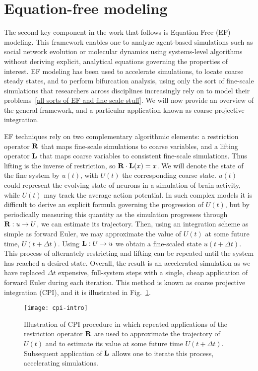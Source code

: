 \section{Equation-free modeling\label{sec:ef}}

The second key component in the work that follows is Equation Free
(EF) modeling. This framework enables one to analyze agent-based
simulations such as social network evolution or molecular dynamics
using systems-level algorithms without deriving explicit, analytical
equations governing the properties of interest. EF modeling has been
used to accelerate simulations, to locate coarse steady states, and to
perform bifurcation analysis, using only the sort of fine-scale
simulations that researchers across disciplines increasingly rely on
to model their problems~\ref{all sorts of EF and fine scale stuff}. We
will now provide an overview of the general framework, and a particular
application known as coarse projective integration.

EF techniques rely on two complementary algorithmic elements: a
restriction operator $\mathbf{R}$ that maps fine-scale simulations to coarse
variables, and a lifting operator $\mathbf{L}$ that maps coarse variables to
consistent fine-scale simulations. Thus lifting is the inverse of
restriction, so $\mathbf{R} \cdot \mathbf{L} (x) = x$. We will denote the state of
the fine system by $u(t)$, with $U(t)$ the corresponding coarse
state. $u(t)$ could represent the evolving state of neurons in a
simulation of brain activity, while $U(t)$ may track the average
action potential. In such complex models it is difficult to derive an
explicit formula governing the progression of $U(t)$, but by
periodically measuring this quantity as the simulation progresses
through $\mathbf{R}: u \rightarrow U$, we can estimate its trajectory. Then,
using an integration scheme as simple as forward Euler, we may
approximate the value of $U(t)$ at some future time,
$U(t + \Delta t)$. Using $\mathbf{L}: U \rightarrow u$ we obtain a
fine-scaled state $u(t + \Delta t)$. This process of alternately
restricting and lifting can be repeated until the system has reached a
desired state. Overall, the result is an accelerated simulation as we
have replaced $\Delta t$ expensive, full-system steps with a single,
cheap application of forward Euler during each iteration. This method
is known as coarse projective integration (CPI), and it is illustrated
in Fig.~\ref{fig:cpi-ill}.

\begin{figure}
  \centering
  \texttt{[image: cpi-intro]}
  \caption[Illustration of coarse projective integration]{Illustration
    of CPI procedure in which repeated applications of the restriction
    operator $\mathbf{R}$ are used to approximate the trajectory of $U(t)$
    and to estimate its value at some future time $U(t + \Delta
    t)$. Subsequent application of $\mathbf{L}$ allows one to iterate this
    process, accelerating simulations. \label{fig:cpi-ill}}
\end{figure}

